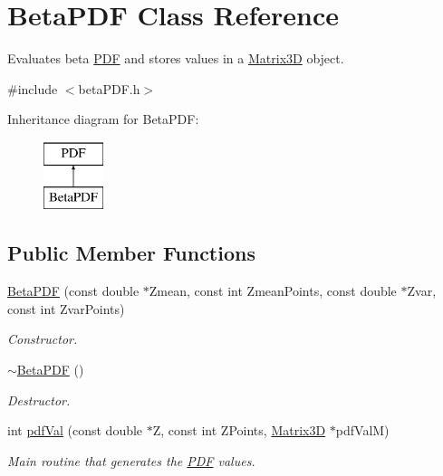 \hypertarget{classBetaPDF}{
\section{BetaPDF Class Reference}
\label{de/d4f/classBetaPDF}
}


Evaluates beta \hyperlink{classPDF}{PDF} and stores values in a \hyperlink{classMatrix3D}{Matrix3D} object.  




{\ttfamily \#include $<$betaPDF.h$>$}

Inheritance diagram for BetaPDF:\begin{figure}[H]
\begin{center}
\leavevmode
\includegraphics[height=2cm]{de/d4f/classBetaPDF}
\end{center}
\end{figure}
\subsection*{Public Member Functions}
\begin{DoxyCompactItemize}
\item 
\hypertarget{classBetaPDF_a0b5160ebefdcd8b696a45a131bab3261}{
\hyperlink{classBetaPDF_a0b5160ebefdcd8b696a45a131bab3261}{BetaPDF} (const double $\ast$Zmean, const int ZmeanPoints, const double $\ast$Zvar, const int ZvarPoints)}
\label{de/d4f/classBetaPDF_a0b5160ebefdcd8b696a45a131bab3261}

\begin{DoxyCompactList}\small\item\em Constructor. \item\end{DoxyCompactList}\item 
\hypertarget{classBetaPDF_a3394efd2861f7a2d5944365ea0edbe50}{
\hyperlink{classBetaPDF_a3394efd2861f7a2d5944365ea0edbe50}{$\sim$BetaPDF} ()}
\label{de/d4f/classBetaPDF_a3394efd2861f7a2d5944365ea0edbe50}

\begin{DoxyCompactList}\small\item\em Destructor. \item\end{DoxyCompactList}\item 
int \hyperlink{classBetaPDF_a5c27da056f9c9b17af0888fac7df2c9f}{pdfVal} (const double $\ast$Z, const int ZPoints, \hyperlink{classMatrix3D}{Matrix3D} $\ast$pdfValM)
\begin{DoxyCompactList}\small\item\em Main routine that generates the \hyperlink{classPDF}{PDF} values. \item\end{DoxyCompactList}\end{DoxyCompactItemize}


